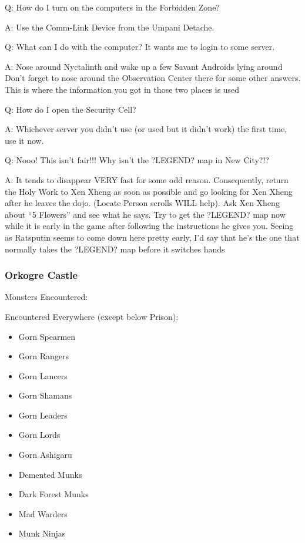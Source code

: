 \documentclass[12pt]{article}
\providecommand{\tightlist}{%
  \setlength{\itemsep}{0pt}\setlength{\parskip}{0pt}}
\begin{document}
Q: How do I turn on the computers in the Forbidden Zone?

A: Use the Comm-Link Device from the Umpani Detache.

Q: What can I do with the computer? It wants me to login to some server.

A: Nose around Nyctalinth and wake up a few Savant Androids lying around
Don't forget to nose around the Observation Center there for some other
answers. This is where the information you got in those two places is
used

Q: How do I open the Security Cell?

A: Whichever server you didn't use (or used but it didn't work) the
first time, use it now.

Q: Nooo! This isn't fair!!! Why isn't the ?LEGEND? map in New City?!?

A: It tends to disappear VERY fast for some odd reason. Consequently,
return the Holy Work to Xen Xheng as soon as possible and go looking for
Xen Xheng after he leaves the dojo. (Locate Person scrolls WILL help).
Ask Xen Xheng about ``5 Flowers'' and see what he says. Try to get the
?LEGEND? map now while it is early in the game after following the
instructions he gives you. Seeing as Ratsputin seems to come down here
pretty early, I'd say that he's the one that normally takes the ?LEGEND?
map before it switches hands

\subsubsection{Orkogre Castle}\label{orkogre-castle}

Monsters Encountered:

Encountered Everywhere (except below Prison):

\begin{itemize}
\tightlist
\item
  Gorn Spearmen
\item
  Gorn Rangers
\item
  Gorn Lancers
\item
  Gorn Shamans
\item
  Gorn Leaders
\item
  Gorn Lords
\item
  Gorn Ashigaru
\item
  Demented Munks
\item
  Dark Forest Munks
\item
  Mad Warders
\item
  Munk Ninjas
\end{itemize}
\end{document}
